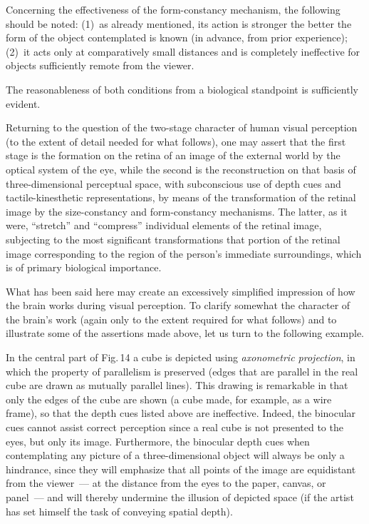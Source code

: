 Concerning the effectiveness of the form-constancy mechanism, the following should
be noted:
(1)~as already mentioned, its action is stronger the better the form of the object
contemplated is known (in advance, from prior experience);
(2)~it acts only at comparatively small distances and is completely ineffective for
objects sufficiently remote from the viewer.

The reasonableness of both conditions from a biological standpoint is sufficiently
evident.

Returning to the question of the two-stage character of human visual perception (to
the extent of detail needed for what follows), one may assert that the first stage is the
formation on the retina of an image of the external world by the optical system of the
eye, while the second is the reconstruction on that basis of three-dimensional perceptual
space, with subconscious use of depth cues and tactile-kinesthetic representations, by
means of the transformation of the retinal image by the size-constancy and
form-constancy mechanisms.  The latter, as it were, ``stretch'' and ``compress''
individual elements of the retinal image, subjecting to the most significant
transformations that portion of the retinal image corresponding to the region of the
person's immediate surroundings, which is of primary biological importance.

What has been said here may create an excessively simplified impression of how the
brain works during visual perception.  To clarify somewhat the character of the brain's
work (again only to the extent required for what follows) and to illustrate some of the
assertions made above, let us turn to the following example.


In the central part of Fig.\,14 a cube is depicted using \emph{axonometric projection},
in which the property of parallelism is preserved (edges that are parallel in the real
cube are drawn as mutually parallel lines).  This drawing is remarkable in that only the
edges of the cube are shown (a cube made, for example, as a wire frame), so that the
depth cues listed above are ineffective.  Indeed, the binocular cues cannot assist correct
perception since a real cube is not presented to the eyes, but only its image.
Furthermore, the binocular depth cues when contemplating any picture of a
three-dimensional object will always be only a hindrance, since they will emphasize that
all points of the image are equidistant from the viewer~--- at the distance from the eyes
to the paper, canvas, or panel~--- and will thereby undermine the illusion of depicted
space (if the artist has set himself the task of conveying spatial depth).

